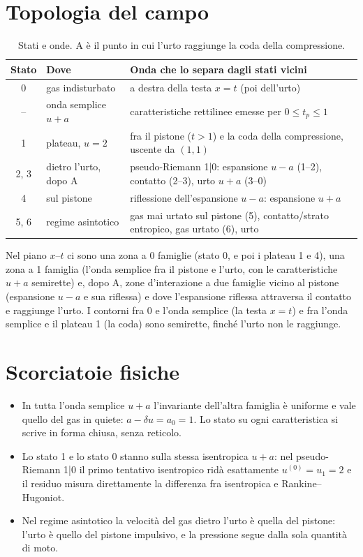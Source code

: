 \documentclass[11pt,a4paper]{article}
\newcommand{\uma}{u-a}
\newcommand{\upa}{u+a}
\begin{document}
\section{Topologia del campo}
\begin{table}[H]
  \centering
  \small
  \begin{tabular}{clp{8.2cm}}
    \toprule
    Stato & Dove & Onda che lo separa dagli stati vicini \\
    \midrule
    0 & gas indisturbato & a destra della testa $x=t$ (poi dell'urto) \\
    -- & onda semplice $\upa$ & caratteristiche rettilinee emesse per $0\le t_p\le1$ \\
    1 & plateau, $u=2$ & fra il pistone ($t>1$) e la coda della compressione, uscente da $(1,1)$ \\
    2, 3 & dietro l'urto, dopo A & pseudo-Riemann 1|0: espansione $\uma$ (1--2), contatto (2--3), urto $\upa$ (3--0) \\
    4 & sul pistone & riflessione dell'espansione $\uma$: espansione $\upa$ \\
    5, 6 & regime asintotico & gas mai urtato sul pistone (5), contatto/strato entropico, gas urtato (6), urto \\
    \bottomrule
  \end{tabular}
  \caption{Stati e onde. A è il punto in cui l'urto raggiunge la coda della compressione.}
\end{table}
Nel piano $x$--$t$ ci sono una zona a 0 famiglie (stato 0, e poi i plateau 1 e 4), una zona a 1 famiglia (l'onda
semplice fra il pistone e l'urto, con le caratteristiche $\upa$ semirette) e, dopo A, zone d'interazione a due
famiglie vicino al pistone (espansione $\uma$ e sua riflessa) e dove l'espansione riflessa attraversa il contatto
e raggiunge l'urto. I contorni fra 0 e l'onda semplice (la testa $x=t$) e fra l'onda semplice e il plateau 1 (la
coda) sono semirette, finché l'urto non le raggiunge.

\section{Scorciatoie fisiche}
\begin{itemize}
\item In tutta l'onda semplice $\upa$ l'invariante dell'altra famiglia è uniforme e vale quello del gas in quiete:
  $a-\delta u=a_0=1$. Lo stato su ogni caratteristica si scrive in forma chiusa, senza reticolo.
\item Lo stato 1 e lo stato 0 stanno sulla stessa isentropica $\upa$: nel pseudo-Riemann 1|0 il primo tentativo
  isentropico ridà esattamente $u^{(0)}=u_1=2$ e il residuo misura direttamente la differenza fra isentropica e
  Rankine--Hugoniot.
\item Nel regime asintotico la velocità del gas dietro l'urto è quella del pistone: l'urto è quello del pistone
  impulsivo, e la pressione segue dalla sola quantità di moto.
\end{itemize}
\end{document}
